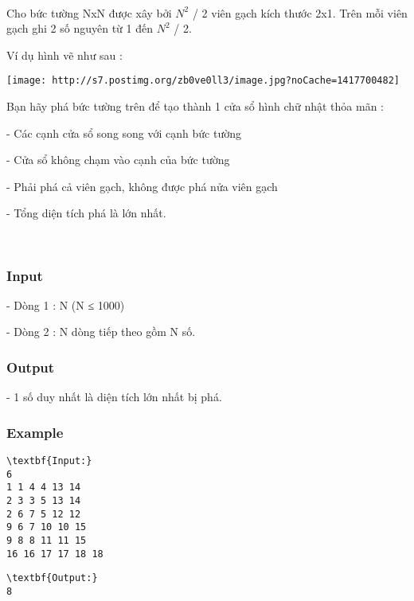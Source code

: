 

 

Cho bức tường NxN được xây bởi $N^{2}$ / 2 viên gạch kích thước 2x1. Trên mỗi viên gạch ghi 2 số nguyên từ 1 đến $N^{2}$ / 2.

Ví dụ hình vẽ như sau :


\texttt{[image: http://s7.postimg.org/zb0ve0ll3/image.jpg?noCache=1417700482]}

Bạn hãy phá bức tường trên để tạo thành 1 cửa sổ hình chữ nhật thỏa mãn :

- Các cạnh cửa sổ song song với cạnh bức tường

- Cửa sổ không chạm vào cạnh của bức tường

- Phải phá cả viên gạch, không được phá nửa viên gạch

- Tổng diện tích phá là lớn nhất.

 

\subsubsection{Input}

- Dòng 1 : N (N ≤ 1000)

- Dòng 2 : N dòng tiếp theo gồm N số.

\subsubsection{Output}

- 1 số duy nhất là diện tích lớn nhất bị phá.

\subsubsection{Example}
\begin{verbatim}
\textbf{Input:}
6
1 1 4 4 13 14
2 3 3 5 13 14
2 6 7 5 12 12
9 6 7 10 10 15
9 8 8 11 11 15
16 16 17 17 18 18 \end{verbatim}
\begin{verbatim}
\textbf{Output:}
8\end{verbatim}
